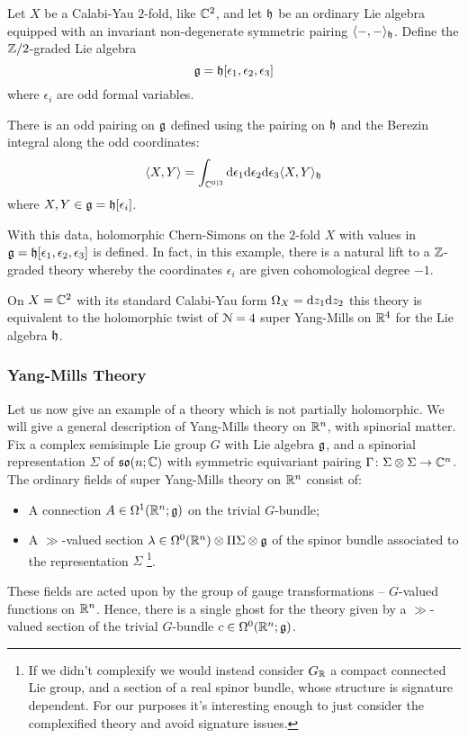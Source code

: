 \documentclass[10pt, oneside]{article}
\begin{document}
\begin{eg} 
Let $X$ be a Calabi-Yau $2$-fold, like $\mathbb C^2$, and let $\mathfrak h$ be an ordinary Lie algebra equipped with an invariant non-degenerate symmetric pairing $\langle-,-\rangle_\mathfrak h$. 
Define the $\mathbb Z/2$-graded Lie algebra
\[
\mathfrak g = \mathfrak h[\epsilon_1,\epsilon_2, \epsilon_3] 
\]
where $\epsilon_i$ are odd formal variables. 

There is an odd pairing on $\mathfrak g$ defined using the pairing on $\mathfrak h$ and the Berezin integral along the odd coordinates:
\[
\langle X , Y\rangle = \int_{\mathbb C^{0|3}} {\rm d} \epsilon_1 {\rm d} \epsilon_2 {\rm d} \epsilon_3 \langle X, Y\rangle_\mathfrak h 
\] 
where $X,Y \in \mathfrak g = \mathfrak h[\epsilon_i]$.

With this data, holomorphic Chern-Simons on the $2$-fold $X$ with values in $\mathfrak g = \mathfrak h[\epsilon_1,\epsilon_2, \epsilon_3]$ is defined. 
 In fact, in this example, there is a natural lift to a $\mathbb Z$-graded theory whereby the coordinates $\epsilon_i$ are given cohomological degree $-1$. 

On $X = \mathbb C^2$ with its standard Calabi-Yau form $\Omega_X = {\rm d} z_1 {\rm d} z_2$ this theory is equivalent to the holomorphic twist of $\mathcal N=4$ super Yang-Mills on $\mathbb R^4$ for the Lie algebra $\mathfrak h$. 

\end{eg} 

\subsubsection{Yang-Mills Theory}
Let us now give an example of a theory which is not partially holomorphic.  We will give a general description of Yang-Mills theory on $\mathbb R^n$, with spinorial matter.  Fix a complex semisimple Lie group $G$ with Lie algebra $\mathfrak g$, and a spinorial representation $\Sigma$ of $\mathfrak{so}(n;\mathbb C)$ with symmetric equivariant pairing $\Gamma \colon \Sigma \otimes \Sigma \to \mathbb C^n$.  The ordinary fields of super Yang-Mills theory on $\mathbb R^{n}$ consist of:
\begin{itemize}
\item A connection $A \in \Omega^1(\mathbb R^{n} ; \mathfrak g)$ on the trivial $G$-bundle;
\item A $\gg$-valued section $\lambda \in \Omega^0(\mathbb R^{n}) \otimes \Pi \Sigma \otimes \mathfrak g$ of the spinor bundle associated to the representation $\Sigma$
\footnote{If we didn't complexify we would instead consider $G_\mathbb R$ a compact connected Lie group, and a section of a real spinor bundle, whose structure is signature dependent.  For our purposes it's interesting enough to just consider the complexified theory and avoid signature issues.}.  
\end{itemize}
These fields are acted upon by the group of gauge transformations -- $G$-valued functions on $\mathbb R^{n}$. 
Hence, there is a single ghost for the theory given by a $\gg$-valued section of the trivial $G$-bundle $c \in \Omega^0(\mathbb R^{n} ; \mathfrak g)$. 
\end{document}
